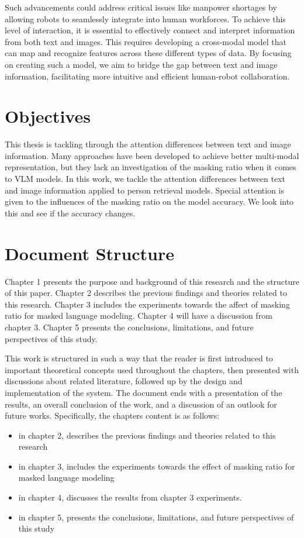 Such advancements could address critical issues like manpower shortages by allowing robots to seamlessly integrate into human workforces. To achieve this level of interaction, it is essential to effectively connect and interpret information from both text and images. This requires developing a cross-modal model that can map and recognize features across these different types of data. By focusing on creating such a model, we aim to bridge the gap between text and image information, facilitating more intuitive and efficient human-robot collaboration.

\section{Objectives}
This thesis is tackling through the attention differences between text and image information. 
Many approaches have been developed to achieve better multi-modal representation, but they lack an investigation of the masking ratio when it comes to VLM models. In this work, we tackle the attention differences between text and image information applied to person retrieval models. Special attention is given to the influences of the masking ratio on the model accuracy. We look into this and see if the accuracy changes.

\section{Document Structure}

Chapter 1 presents the purpose and background of this research and the structure of this paper. Chapter 2 describes the previous findings and theories related to this research. Chapter 3 includes the experiments towards the affect of masking ratio for masked language modeling. Chapter 4 will have a discussion from chapter 3. Chapter 5 presents the conclusions, limitations, and future perspectives of this study.

This work is structured in such a way that the reader is first introduced to important theoretical concepts used throughout the chapters, then presented with discussions about related literature, followed up by the design and implementation of the system. The document ends with a presentation of the results, an overall conclusion of the work, and a discussion of an outlook for future works. Specifically, the chapters content is as follows:

\begin{itemize}
    \item in chapter 2, describes the previous findings and theories related to this research
    \item in chapter 3, includes the experiments towards the effect of masking ratio for masked language modeling
    \item in chapter 4, discusses the results from chapter 3 experiments.
    \item in chapter 5, presents the conclusions, limitations, and future perspectives of this study
\end{itemize}

